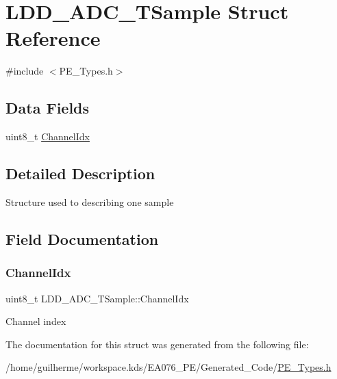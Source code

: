 \hypertarget{struct_l_d_d___a_d_c___t_sample}{}\section{L\+D\+D\+\_\+\+A\+D\+C\+\_\+\+T\+Sample Struct Reference}
\label{struct_l_d_d___a_d_c___t_sample}


{\ttfamily \#include $<$P\+E\+\_\+\+Types.\+h$>$}

\subsection*{Data Fields}
\begin{DoxyCompactItemize}
\item 
uint8\+\_\+t \hyperlink{struct_l_d_d___a_d_c___t_sample_ae2737bdf799311a9bc9f7acf30f569c1}{Channel\+Idx}
\end{DoxyCompactItemize}


\subsection{Detailed Description}
Structure used to describing one sample 

\subsection{Field Documentation}
\mbox{\label{struct_l_d_d___a_d_c___t_sample_ae2737bdf799311a9bc9f7acf30f569c1}} 
\subsubsection{\texorpdfstring{Channel\+Idx}{ChannelIdx}}
{\footnotesize\ttfamily uint8\+\_\+t L\+D\+D\+\_\+\+A\+D\+C\+\_\+\+T\+Sample\+::\+Channel\+Idx}

Channel index 

The documentation for this struct was generated from the following file\+:\begin{DoxyCompactItemize}
\item 
/home/guilherme/workspace.\+kds/\+E\+A076\+\_\+\+P\+E/\+Generated\+\_\+\+Code/\hyperlink{_p_e___types_8h}{P\+E\+\_\+\+Types.\+h}\end{DoxyCompactItemize}

